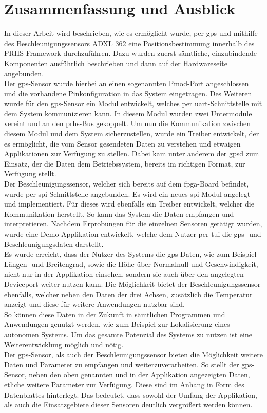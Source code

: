 \chapter{Zusammenfassung und Ausblick}\label{ch:schluss}

In dieser Arbeit wird beschrieben, wie es ermöglicht wurde, per \ac{gps} und mithilfe des Beschleunigungssensors
ADXL 362 eine Positionsbestimmung innerhalb des PRHS-Framework durchzuführen. Dazu wurden zuerst sämtliche, einzubindende
Komponenten ausführlich beschrieben und dann auf der Hardwareseite angebunden. \\
Der \ac{gps}-Sensor wurde hierbei an einen sogenannten Pmod-Port angeschlossen und die vorhandene Pinkonfiguration
in das System eingetragen. Des Weiteren wurde für den \ac{gps}-Sensor ein Modul entwickelt,
welches per \ac{uart}-Schnittstelle mit dem System kommunizieren kann. In diesem Modul wurden zwei Untermodule
vereint und an den \ac{prhs}-Bus gekoppelt. Um nun die Kommunikation zwischen diesem Modul und dem System
sicherzustellen, wurde ein Treiber entwickelt, der es ermöglicht, die vom Sensor gesendeten Daten zu verstehen
und etwaigen Applikationen zur Verfügung zu stellen. Dabei kam unter anderem der \ac{gpsd} zum Einsatz, der die
Daten dem Betriebssystem, bereits im richtigen Format, zur Verfügung stellt.\\
Der Beschleunigungssensor, welcher sich bereits auf dem \ac{fpga}-Board befindet, wurde per
\ac{spi}-Schnittstelle angebunden. Es wird ein neues \ac{spi}-Modul angelegt und implementiert. Für
dieses wird ebenfalls ein Treiber entwickelt, welcher die Kommunikation herstellt. So kann das
System die Daten empfangen und interpretieren. Nachdem Erprobungen für die einzelnen Sensoren getätigt wurden,
wurde eine Demo-Applikation entwickelt, welche dem Nutzer per \ac{tui} die \ac{gps}- und Beschleunigungsdaten darstellt.\\
Es wurde erreicht, dass der Nutzer des Systems die \ac{gps}-Daten, wie zum Beispiel Längen- und Breitengrad,
sowie die Höhe über Normalnull und Geschwindigkeit, nicht nur in der Applikation einsehen, sondern sie auch
über den angelegten Deviceport weiter nutzen kann. Die Möglichkeit bietet der Beschleunigungssensor ebenfalls, welcher
neben den Daten der drei Achsen, zusätzlich die Temperatur anzeigt und diese für weitere Anwendungen nutzbar sind.\\
So können diese Daten in der Zukunft in sämtlichen Programmen und Anwendungen genutzt werden, wie zum Beispiel zur
Lokalisierung eines autonomen Systems. Um das gesamte Potenzial des Systems zu nutzen ist eine Weiterentwicklung
möglich und nötig.\\
Der \ac{gps}-Sensor, als auch der Beschleunigungssensor bieten die Möglichkeit weitere
Daten und Parameter zu empfangen und weiterzuverarbeiten. So stellt der \ac{gps}-Sensor, neben den oben genannten
und in der Applikation angezeigten Daten, etliche weitere Parameter zur Verfügung. Diese sind im Anhang in Form
des Datenblattes hinterlegt. Das bedeutet, dass sowohl der Umfang der Applikation, als auch die Einsatzgebiete
dieser Sensoren deutlich vergrößert werden können.
